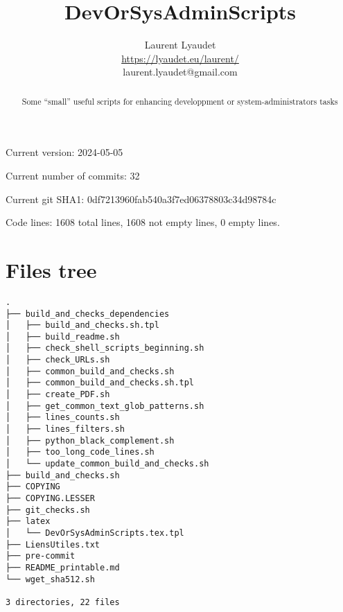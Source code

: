 \documentclass{article}
\begin{document}
\author{
  Laurent Lyaudet\\
  \url{https://lyaudet.eu/laurent/}\\
  laurent.lyaudet@gmail.com
}
\title{DevOrSysAdminScripts}

\maketitle
\begin{abstract}
Some ``small'' useful scripts
for enhancing developpment or system-administrators tasks
\end{abstract}

Current version: 2024-05-05

Current number of commits: 32

Current git SHA1: 0df7213960fab540a3f7ed06378803c34d98784c

Code lines: 1608 total lines, 1608 not empty lines, 0 empty lines.

\section{Files tree}
\label{section:tree}

\begin{verbatim}
.
├── build_and_checks_dependencies
│   ├── build_and_checks.sh.tpl
│   ├── build_readme.sh
│   ├── check_shell_scripts_beginning.sh
│   ├── check_URLs.sh
│   ├── common_build_and_checks.sh
│   ├── common_build_and_checks.sh.tpl
│   ├── create_PDF.sh
│   ├── get_common_text_glob_patterns.sh
│   ├── lines_counts.sh
│   ├── lines_filters.sh
│   ├── python_black_complement.sh
│   ├── too_long_code_lines.sh
│   └── update_common_build_and_checks.sh
├── build_and_checks.sh
├── COPYING
├── COPYING.LESSER
├── git_checks.sh
├── latex
│   └── DevOrSysAdminScripts.tex.tpl
├── LiensUtiles.txt
├── pre-commit
├── README_printable.md
└── wget_sha512.sh

3 directories, 22 files
\end{verbatim}
\end{document}
